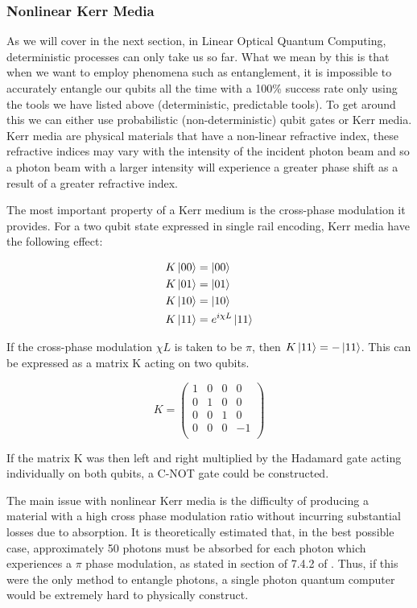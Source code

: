 \subsubsection{Nonlinear Kerr Media}
As we will cover in the next section, in Linear Optical Quantum Computing, deterministic processes can only take us so far. What we mean by this is that when we want to employ phenomena such as entanglement, it is impossible to accurately entangle our qubits all the time with a 100\% success rate only using the tools we have listed above (deterministic, predictable tools). To get around this we can either use probabilistic (non-deterministic) qubit gates or Kerr media. Kerr media are physical materials that have a non-linear refractive index, these refractive indices may vary with the intensity of the incident photon beam and so a photon beam with a larger intensity will experience a greater phase shift as a result of a greater refractive index.
\par 
The most important property of a Kerr medium is the cross-phase modulation it provides. For a two qubit state expressed in single rail encoding, Kerr media have the following effect:

\begin{align*} 
    K \ket{00} &=  \ket{00}\\
    K \ket{01} &=  \ket{01}\\
    K \ket{10} &=  \ket{10}\\
    K \ket{11} &=  e^{i\chi L}\ket{11}
    \end{align*}
    
If the cross-phase modulation $\chi L$ is taken to be $\pi$, then $K \ket{11} =  -\ket{11}$. This can be expressed as a matrix K acting on two qubits.

$$K = \begin{pmatrix}
    1 & 0 & 0 & 0\\
    0 & 1 & 0 & 0\\
    0 & 0 & 1 & 0\\
    0 & 0 & 0 & -1\\
    \end{pmatrix}$$

If the matrix K was then left and right multiplied by the Hadamard gate acting individually on both qubits, a C-NOT gate could be constructed. 

The main issue with nonlinear Kerr media is the difficulty of producing a material with a high cross phase modulation ratio without incurring substantial losses due to absorption. It is theoretically estimated that, in the best possible case, approximately 50 photons must be absorbed for each photon which experiences a $\pi$ phase modulation, as stated in section of 7.4.2 of \cite{nielsen_chuang_2010}. Thus, if this were the only method to entangle photons, a single photon quantum computer would be extremely hard to physically construct.



